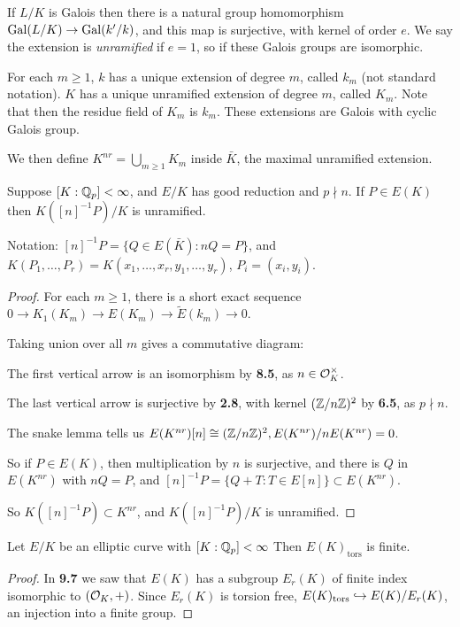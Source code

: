 \documentclass[10pt,a4paper]{article}
\begin{document}
If $L/K$ is Galois then there is a natural group homomorphism $\operatorname{Gal}(L/K) \to \operatorname{Gal}(k'/k)$, and this map is surjective, with kernel of order $e$. We say the extension is \emph{unramified} if $e=1$, so if these Galois groups are isomorphic.

For each $m \geq 1$, $k$ has a unique extension of degree $m$, called $k_m$ (not standard notation). $K$ has a unique unramified extension of degree $m$, called $K_m$. Note that then the residue field of $K_m$ is $k_m$. These extensions are Galois with cyclic Galois group.

We then define $K^{nr} = \bigcup_{m\geq 1} K_m$ inside $\bar{K}$, the maximal unramified extension.

\begin{theorem}
  Suppose $[K:\mathbb{Q}_p] < \infty$, and $E/K$ has good reduction and $p\nmid n$. If $P \in E(K)$ then $K([n]^{-1}P)/K$ is unramified.
\end{theorem}
Notation: $[n]^{-1}P = \{Q \in E(\bar{K}) : nQ = P\}$, and $K(P_1, \ldots, P_r) = K(x_1, \ldots, x_r, y_1, \ldots, y_r)$, $P_i = (x_i, y_i)$.

\begin{proof}
  For each $m \geq 1$, there is a short exact sequence $0\to K_1(K_m) \to E(K_m) \to \tilde{E}(k_m) \to 0$.

  Taking union over all $m$ gives a commutative diagram:
  \begin{center}
  \end{center}
  The first vertical arrow is an isomorphism by \textbf{8.5}, as $n \in \mathcal{O}_K^\times$.

  The last vertical arrow is surjective by \textbf{2.8}, with kernel $(\mathbb{Z}/n\mathbb{Z})^2$ by \textbf{6.5}, as $p \nmid n$.

  The snake lemma tells us $E(K^{nr})[n]\cong (\mathbb{Z}/n\mathbb{Z})^2, E(K^{nr})/nE(K^{nr}) = 0$.

  So if $P \in E(K)$, then multiplication by $n$ is surjective, and there is $Q$ in $E(K^{nr})$ with $nQ = P$, and $[n]^{-1}P = \{Q+T:T\in E[n]\} \subset E(K^{nr})$.

  So $K([n]^{-1}P) \subset K^{nr}$, and $K([n]^{-1}P)/K$ is unramified.
\end{proof}
\begin{corollary}
  Let $E/K$ be an elliptic curve with $[K:\mathbb{Q}_p]<\infty$ Then $E(K)_{\text{tors}}$ is finite.
\end{corollary}
\begin{proof}
  In \textbf{9.7} we saw that $E(K)$ has a subgroup $E_r(K)$ of finite index isomorphic to $(\mathcal{O}_K, +)$. Since $E_r(K)$ is torsion free, $E(K)_{\text{tors}}\hookrightarrow E(K)/E_r(K)$, an injection into a finite group.
\end{proof}
\end{document}
